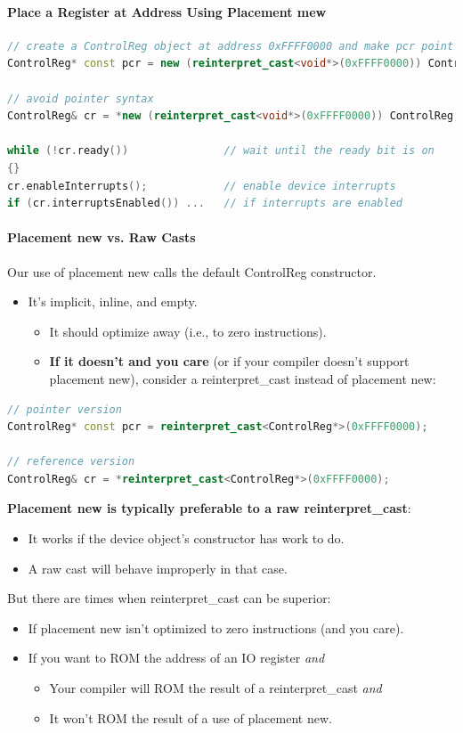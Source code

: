\paragraph{Place a Register at Address Using Placement mew}
\begin{lstlisting}[language=C++]
// create a ControlReg object at address 0xFFFF0000 and make pcr point to it
ControlReg* const pcr = new (reinterpret_cast<void*>(0xFFFF0000)) ControlReg;

// avoid pointer syntax
ControlReg& cr = *new (reinterpret_cast<void*>(0xFFFF0000)) ControlReg;

while (!cr.ready())               // wait until the ready bit is on
{}
cr.enableInterrupts();            // enable device interrupts
if (cr.interruptsEnabled()) ...   // if interrupts are enabled
\end{lstlisting}

\paragraph{Placement new vs. Raw Casts}
Our use of placement new calls the default ControlReg constructor.
\begin{itemize}
  \item It's implicit, inline, and empty.
  \begin{itemize}
    \item It should optimize away (i.e., to zero instructions).
    \item \textbf{If it doesn't and you care} (or if your compiler doesn't support placement new), consider a reinterpret\_cast instead of placement new:
  \end{itemize}
\end{itemize}
\begin{lstlisting}[language=C++]
// pointer version
ControlReg* const pcr = reinterpret_cast<ControlReg*>(0xFFFF0000);

// reference version
ControlReg& cr = *reinterpret_cast<ControlReg*>(0xFFFF0000);
\end{lstlisting}
\textbf{Placement new is typically preferable to a raw reinterpret\_cast}:
\begin{itemize}
  \item It works if the device object's constructor has work to do.
  \item A raw cast will behave improperly in that case.
\end{itemize}
But there are times when reinterpret\_cast can be superior:
\begin{itemize}
  \item If placement new isn't optimized to zero instructions (and you care).
  \item If you want to ROM the address of an IO register \textit{and}
  \begin{itemize}
    \item Your compiler will ROM the result of a reinterpret\_cast \textit{and}
    \item It won't ROM the result of a use of placement new.
  \end{itemize}
\end{itemize}

